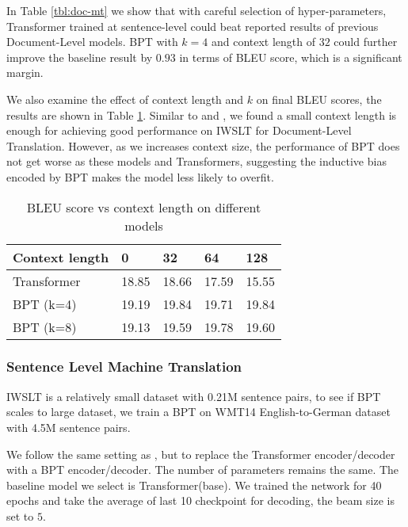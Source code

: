 \documentclass[11pt,a4paper]{article}
\begin{document}
In Table \ref{tbl:doc-mt} we show that with careful selection of hyper-parameters, Transformer trained at sentence-level could beat reported results of previous Document-Level models. BPT with $k=4$ and context length of $32$ could further improve the baseline result by $0.93$ in terms of BLEU score, which is a significant margin.

We also examine the effect of context length and $k$ on final BLEU scores, the results are shown in Table \ref{tbl:doc-mt-ctx}.  Similar to  \citet{tu2018learning} and  \citet{miculicich-etal-2018-document}, we found a small context length is enough for achieving good performance on IWSLT for Document-Level Translation. However, as we increases context size, the performance of BPT does not get worse as these models and Transformers, suggesting the inductive bias encoded by BPT makes the model less likely to overfit.

\begin{table}[!htb]
\small
\centering
\begin{tabular}{lllll}
\toprule
Context length & 0     & 32    & 64    & 128   \\
\midrule
Transformer    & 18.85 & 18.66 & 17.59 & 15.55 \\
BPT (k=4)       & 19.19 & 19.84 & 19.71 & 19.84 \\
BPT (k=8)       & 19.13 & 19.59 & 19.78 & 19.60 \\
\bottomrule
\end{tabular}
\caption{BLEU score vs context length on different models}
\label{tbl:doc-mt-ctx}
\end{table}

\subsubsection{Sentence Level Machine Translation}

IWSLT is a relatively small dataset with 0.21M sentence pairs, to see if BPT scales to large dataset, we train a BPT on WMT14 English-to-German dataset with 4.5M sentence pairs.

We follow the same setting as \cite{vaswani2017attention}, but to replace the Transformer encoder/decoder with a BPT encoder/decoder.
The number of parameters remains the same.
The baseline model we select is Transformer(base).
We trained the network for 40 epochs and take the average of last 10 checkpoint for decoding, the beam size is set to $5$.
\end{document}
